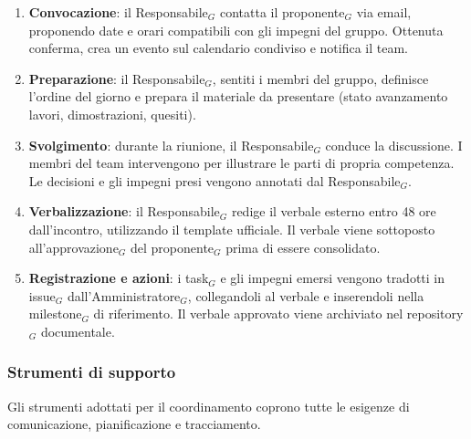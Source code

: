 \documentclass[a4paper, 10pt]{article}
\begin{document}
\begin{enumerate}
    \item \textbf{Convocazione}: il Responsabile$_G$ contatta il proponente$_G$ via email, proponendo date e orari compatibili con gli impegni del gruppo. Ottenuta conferma, crea un evento sul calendario condiviso e notifica il team.
    \item \textbf{Preparazione}: il Responsabile$_G$, sentiti i membri del gruppo, definisce l'ordine del giorno e prepara il materiale da presentare (stato avanzamento lavori, dimostrazioni, quesiti).
    \item \textbf{Svolgimento}: durante la riunione, il Responsabile$_G$ conduce la discussione. I membri del team intervengono per illustrare le parti di propria competenza. Le decisioni e gli impegni presi vengono annotati dal Responsabile$_G$.
    \item \textbf{Verbalizzazione}: il Responsabile$_G$ redige il verbale esterno entro 48 ore dall'incontro, utilizzando il template ufficiale. Il verbale viene sottoposto all'approvazione$_G$ del proponente$_G$ prima di essere consolidato.
    \item \textbf{Registrazione e azioni}: i task$_G$ e gli impegni emersi vengono tradotti in issue$_G$ dall'Amministratore$_G$, collegandoli al verbale e inserendoli nella milestone$_G$ di riferimento. Il verbale approvato viene archiviato nel repository$_G$ documentale.
\end{enumerate}

\subsubsection{Strumenti di supporto}
\label{subsubsec:strumenti_coordinamento}

Gli strumenti adottati per il coordinamento coprono tutte le esigenze di comunicazione, pianificazione e tracciamento.
\end{document}
